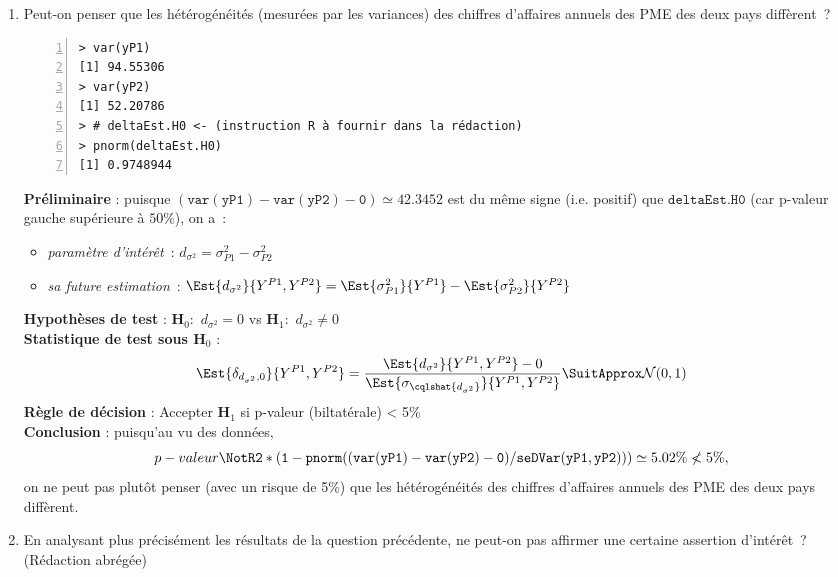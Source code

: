\documentclass[10pt]{report}
\begin{document}
\begin{exercice}
\begin{enumerate}
\item Peut-on penser que les hétérogénéités (mesurées par les variances) des chiffres d'affaires annuels des PME des deux pays diffèrent~?

\IndicR
 \begin{Verbatim}[frame=leftline,fontfamily=tt,fontshape=n,numbers=left]
> var(yP1)
[1] 94.55306
> var(yP2)
[1] 52.20786
> # deltaEst.H0 <- (instruction R à fournir dans la rédaction)
> pnorm(deltaEst.H0)
[1] 0.9748944
\end{Verbatim}


\begin{Correction}
\noindent \textbf{Préliminaire} : puisque $\mathtt{(var(yP1)-var(yP2)-0)}\simeq42.3452$ est du même signe (i.e. positif) que $\mathtt{deltaEst.H0}$ (car p-valeur gauche supérieure à $50\%$), on a~: 
      \begin{itemize}
\item \textit{paramètre d'intérêt}~: $d_{\sigma^2}=\sigma^2_{P1}-\sigma^2_{P2}$
\item \textit{sa future estimation}~: $\Est{d_{\sigma^2}}{Y^{P1},Y^{P2}}=\Est{\sigma^2_{P1}}{Y^{P1}}-\Est{\sigma^2_{P2}}{Y^{P2}}$
\end{itemize}
\noindent \textbf{Hypothèses de test} : $\mathbf{H}_0:$ $d_{\sigma^2}=0$ vs {\large $\mathbf{H}_1:$ $d_{\sigma^2}\neq0$}\\
\textbf{Statistique de test sous $\mathbf{H}_0$} :
  $$
  \Est{\delta_{d_{\sigma^2},0}}{Y^{P1},Y^{P2}}= {\displaystyle \frac{\Est{d_{\sigma^2}}{Y^{P1},Y^{P2}}-0}{
\Est{\sigma_{\cqlshat{d_{\sigma^2}}}}{Y^{P1},Y^{P2}}
}} 
  \SuitApprox \mathcal{N}(0,1)
  $$
\textbf{Règle de décision} : Accepter $\mathbf{H}_1$ si 
  p-valeur (biltatérale) < 5\%\\
\noindent \textbf{Conclusion} :
puisqu'au vu des données, 
  \[
p-valeur\NotR\mathtt{2*(1-pnorm((var(yP1)-var(yP2)-0)/seDVar(yP1,yP2)))} \simeq 5.02\%\nless5\%,
\]
on ne peut pas plutôt penser (avec un risque de 5\%) que les hétérogénéités des chiffres d'affaires annuels des PME des deux pays diffèrent.
\end{Correction}




\item En analysant plus précisément les résultats de la question précédente, ne peut-on pas affirmer une certaine assertion d'intérêt~? (Rédaction abrégée)



\end{enumerate}
\end{exercice}
\end{document}
